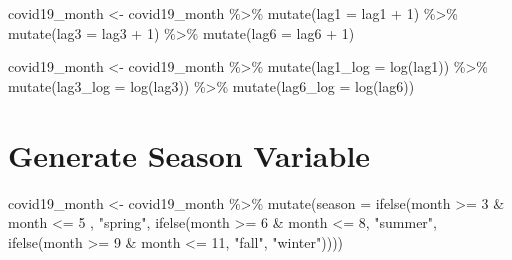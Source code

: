 \documentclass[
]{book}
\newenvironment{Shaded}{\begin{snugshade}}{\end{snugshade}}
\newcommand{\AttributeTok}[1]{\textcolor[rgb]{0.77,0.63,0.00}{#1}}
\newcommand{\DecValTok}[1]{\textcolor[rgb]{0.00,0.00,0.81}{#1}}
\newcommand{\FunctionTok}[1]{\textcolor[rgb]{0.00,0.00,0.00}{#1}}
\newcommand{\NormalTok}[1]{#1}
\newcommand{\OtherTok}[1]{\textcolor[rgb]{0.56,0.35,0.01}{#1}}
\newcommand{\SpecialCharTok}[1]{\textcolor[rgb]{0.00,0.00,0.00}{#1}}
\newcommand{\StringTok}[1]{\textcolor[rgb]{0.31,0.60,0.02}{#1}}
\begin{document}
\begin{Shaded}
\begin{Highlighting}[]
\NormalTok{covid19\_month }\OtherTok{\textless{}{-}}\NormalTok{ covid19\_month }\SpecialCharTok{\%\textgreater{}\%}
  \FunctionTok{mutate}\NormalTok{(}\AttributeTok{lag1 =}\NormalTok{ lag1 }\SpecialCharTok{+} \DecValTok{1}\NormalTok{) }\SpecialCharTok{\%\textgreater{}\%}
  \FunctionTok{mutate}\NormalTok{(}\AttributeTok{lag3 =}\NormalTok{ lag3 }\SpecialCharTok{+} \DecValTok{1}\NormalTok{) }\SpecialCharTok{\%\textgreater{}\%}
  \FunctionTok{mutate}\NormalTok{(}\AttributeTok{lag6 =}\NormalTok{ lag6 }\SpecialCharTok{+} \DecValTok{1}\NormalTok{)}

\NormalTok{covid19\_month }\OtherTok{\textless{}{-}}\NormalTok{ covid19\_month }\SpecialCharTok{\%\textgreater{}\%}
  \FunctionTok{mutate}\NormalTok{(}\AttributeTok{lag1\_log =} \FunctionTok{log}\NormalTok{(lag1)) }\SpecialCharTok{\%\textgreater{}\%}
  \FunctionTok{mutate}\NormalTok{(}\AttributeTok{lag3\_log =} \FunctionTok{log}\NormalTok{(lag3)) }\SpecialCharTok{\%\textgreater{}\%}
  \FunctionTok{mutate}\NormalTok{(}\AttributeTok{lag6\_log =} \FunctionTok{log}\NormalTok{(lag6))}
\end{Highlighting}
\end{Shaded}

\hypertarget{generate-season-variable}{%
\section{Generate Season Variable}\label{generate-season-variable}}

\begin{Shaded}
\begin{Highlighting}[]
\NormalTok{covid19\_month }\OtherTok{\textless{}{-}}\NormalTok{ covid19\_month }\SpecialCharTok{\%\textgreater{}\%}
  \FunctionTok{mutate}\NormalTok{(}\AttributeTok{season =} \FunctionTok{ifelse}\NormalTok{(month }\SpecialCharTok{\textgreater{}=} \DecValTok{3} \SpecialCharTok{\&}\NormalTok{ month }\SpecialCharTok{\textless{}=} \DecValTok{5}\NormalTok{ , }\StringTok{"spring"}\NormalTok{, }\FunctionTok{ifelse}\NormalTok{(month }\SpecialCharTok{\textgreater{}=} \DecValTok{6} \SpecialCharTok{\&}\NormalTok{ month }\SpecialCharTok{\textless{}=} \DecValTok{8}\NormalTok{, }\StringTok{"summer"}\NormalTok{, }\FunctionTok{ifelse}\NormalTok{(month }\SpecialCharTok{\textgreater{}=} \DecValTok{9} \SpecialCharTok{\&}\NormalTok{ month }\SpecialCharTok{\textless{}=} \DecValTok{11}\NormalTok{, }\StringTok{"fall"}\NormalTok{, }\StringTok{"winter"}\NormalTok{))))}
\end{Highlighting}
\end{Shaded}
\end{document}
